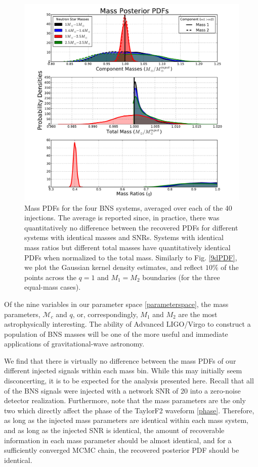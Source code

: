 \documentclass[11pt,a4paper]{emulateapj} 
\newcommand{\chmass}{\mathcal{M}_c}
\begin{document}
\begin{figure}[ht!]
  \centering \includegraphics[trim=2cm 0cm 2cm 0cm,
    clip=false,scale=0.7]{newMasses.pdf}
 \caption{Mass PDFs for the four BNS systems, averaged over each of
   the 40 injections.  The average is reported since, in practice,
   there was quantitatively no difference between the recovered PDFs
   for different systems with identical masses and SNRs.  Systems with
   identical mass ratios but different total masses have
   quantitatively identical PDFs when normalized to the total
   mass.  Similarly to Fig. \ref{9dPDF}, we plot the Gaussian kernel density
   estimates, and reflect $10\%$ of the points across the $q = 1$ and $M_1 = M_2$ boundaries (for the three equal-mass cases).}
  \label{metaMassPDFs}
\end{figure}

Of the nine variables in our parameter space \eqref{parameterspace},
the mass parameters, $\chmass$ and $q$, or, correspondingly, $M_1$ and
$M_2$ are the most astrophysically interesting.  The ability of
Advanced LIGO/Virgo to construct a population of BNS masses will be
one of the more useful and immediate applications of gravitational-wave astronomy.

We find that there is virtually no difference between the mass PDFs of
our different injected signals within each mass bin.  While this may
initially seem disconcerting, it is to be expected for the analysis presented here.
  Recall that all
of the BNS signals were injected with a network SNR of 20 into a
zero-noise detector realization.  Furthermore, note that the mass
parameters are the only two which directly affect the phase of the
TaylorF2 waveform \eqref{phase}.  Therefore, as long as the injected
mass parameters are identical within each mass system, and as long as
the injected SNR is identical, the amount of recoverable information
in each mass parameter should be almost identical, and for a
sufficiently converged MCMC chain, the recovered posterior PDF should
be identical.
\end{document}
